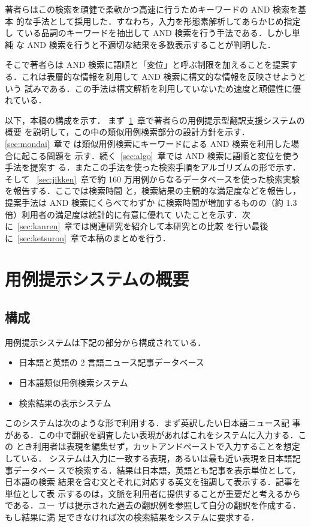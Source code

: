 著者らはこの検索を頑健で柔軟かつ高速に行うためキーワードの AND 検索を基本
的な手法として採用した．すなわち，入力を形態素解析してあらかじめ指定し
ている品詞のキーワードを抽出して AND 検索を行う手法である．しかし単純
な AND 検索を行うと不適切な結果を多数表示することが判明した．

そこで著者らは AND 検索に語順と「変位」と呼ぶ制限を加えることを提案す
る．これは表層的な情報を利用して AND 検索に構文的な情報を反映させようという
試みである．この手法は構文解析を利用していないため速度と頑健性に優れている．

以下，本稿の構成を示す．
まず~\ref{sec:gaiyou}~章で著者らの用例提示型翻訳支援システムの概要
を説明して，この中の類似用例検索部分の設計方針を示す．\ref{sec:mondai}~章で
は類似用例検索にキーワードによる AND 検索を利用した場合に起こる問題を
示す．続く~\ref{sec:algo}~章では AND 検索に語順と変位を使う手法を提案す
る．またこの手法を使った検索手順をアルゴリズムの形で示す．そして~
\ref{sec:jikken}~章で約 160 
万用例からなるデータベースを使った検索実験を報告する．ここでは検索時間
と，検索結果の主観的な満足度などを報告し，提案手法は AND 検索にくらべてわずか
に検索時間が増加するものの（約 1.3 倍）利用者の満足度は統計的に有意に優れて
いたことを示す．次に~\ref{sec:kanren}~章では関連研究を紹介して本研究との比較
を行い最後に~\ref{sec:ketsuron}~章で本稿のまとめを行う．

\section{用例提示システムの概要}
\label{sec:gaiyou}
\subsection{構成}
用例提示システムは下記の部分から構成されている．
\begin{itemize}
 \item 日本語と英語の 2 言語ニュース記事データベース
 \item 日本語類似用例検索システム
 \item 検索結果の表示システム
\end{itemize}

このシステムは次のような形で利用する．まず英訳したい日本語ニュース記
事がある．この中で翻訳を調査したい表現があればこれをシステムに入力する．この
とき利用者は表現を編集せず，カットアンドペーストで入力することを想定している．
システムは入力に一致する表現，あるいは最も近い表現を日本語記事データベー
スで検索する．結果は日本語，英語とも記事を表示単位として，日本語の検索
結果を含む文とそれに対応する英文を強調して表示する．記事を単位として表
示するのは，文脈を利用者に提供することが重要だと考えるからである．ユー
ザは提示された過去の翻訳例を参照して自分の翻訳を作成する．もし結果に満
足できなければ次の検索結果をシステムに要求する．
\vspace{-3mm}
